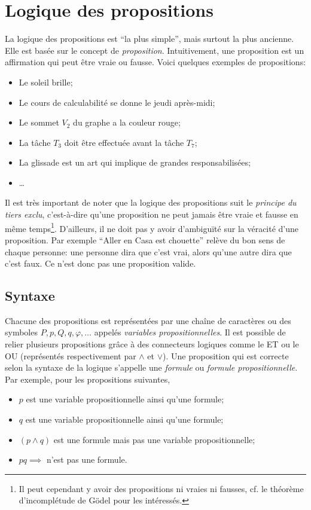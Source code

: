 \section{Logique des propositions}
La logique des propositions est ``la plus simple'', mais surtout la plus ancienne. Elle est basée sur le concept de \textit{proposition}. Intuitivement, une proposition est un affirmation qui peut être vraie ou fausse. Voici quelques exemples de propositions:
\begin{itemize}
\item Le soleil brille; 
\item Le cours de calculabilité se donne le jeudi après-midi;
\item Le sommet $V_2$ du graphe a la couleur rouge;
\item La tâche $T_3$ doit être effectuée avant la tâche $T_7$;
\item La glissade est un art qui implique de grandes responsabilisées; 
\item \dots
\end{itemize}

Il est très important de noter que la logique des propositions suit le \textit{principe du tiers exclu}, c'est-à-dire qu'une proposition ne peut jamais être vraie et fausse en même temps\footnote{Il peut cependant y avoir des propositions ni vraies ni fausses, cf. le théorème d'incomplétude de Gödel pour les intéressés.}. D'ailleurs, il ne doit pas y avoir d'ambiguïté sur la véracité d'une proposition. Par exemple ``Aller en Casa est chouette'' relève du bon sens de chaque personne: une personne dira que c'est vrai, alors qu'une autre dira que c'est faux. Ce n'est donc pas une proposition valide.

\subsection{Syntaxe}
Chacune des propositions est représentées par une chaîne de caractères ou des symboles $P,p,Q,q,\varphi,\dotsc$ appelés \textit{variables propositionnelles}. Il est possible de relier plusieurs propositions grâce à des connecteurs logiques comme le ET ou le OU (représentés respectivement par $\land$ et $\lor$). Une proposition qui est correcte selon la syntaxe de la logique s'appelle une \textit{formule} ou \textit{formule propositionnelle}. Par exemple, pour les propositions suivantes,
\begin{itemize}
\item $p$ est une variable propositionnelle ainsi qu'une formule;
\item $q$ est une variable propositionnelle ainsi qu'une formule;
\item $(p\land q)$ est une formule mais pas une variable propositionnelle;
\item $pq\implies$ n'est pas une formule.
\end{itemize}

